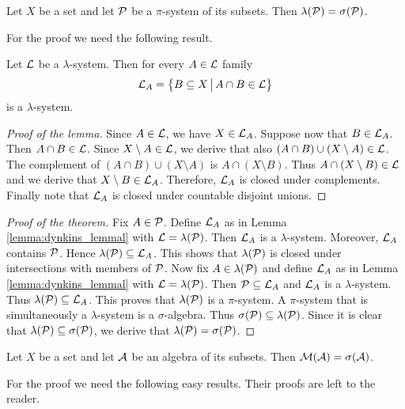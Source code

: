 \begin{theorem}\label{theorem:dynkins_lemma}
Let $X$ be a set and let ${\mathcal P}$ be a $\pi$-system of its subsets. Then $\lambda({\mathcal P})=\sigma({\mathcal P})$.
\end{theorem}
\noindent
For the proof we need the following result.

\begin{lemma}\label{lemma:dynkins_lemmal}
Let ${\mathcal L}$ be a $\lambda$-system. Then for every $A\in {\mathcal L}$ family
$${\mathcal L}_A=\big\{B\subseteq X\,\big|\,A\cap B\in {\mathcal L} \big\}$$
is a $\lambda$-system.
\end{lemma}
\begin{proof}[Proof of the lemma]
Since $A\in {\mathcal L}$, we have $X\in {\mathcal L}_A$. Suppose now that $B\in {\mathcal L}_A$. Then $A\cap B\in {\mathcal L}$. Since $X\setminus A\in {\mathcal L}$, we derive that also $(A\cap B) \cup (X\setminus A)\in {\mathcal L}$. The complement of $(A\cap B) \cup (X\setminus A)$ is $A\cap (X\setminus B)$. Thus $A\cap (X\setminus B) \in {\mathcal L}$ and we derive that $X\setminus B \in {\mathcal L}_A$. Therefore, ${\mathcal L}_A$ is closed under complements. Finally note that ${\mathcal L}_A$ is closed under countable disjoint unions. 
\end{proof}

\begin{proof}[Proof of the theorem]
Fix $A\in {\mathcal P}$. Define ${\mathcal L}_A$ as in Lemma \ref{lemma:dynkins_lemmal} with ${\mathcal L} = \lambda({\mathcal P})$. Then ${\mathcal L}_A$ is a $\lambda$-system. Moreover, ${\mathcal L}_A$ contains ${\mathcal P}$. Hence $\lambda({\mathcal P})\subseteq {\mathcal L}_A$. This shows that $\lambda({\mathcal P})$ is closed under intersections with members of ${\mathcal P}$. Now fix $A\in \lambda({\mathcal P})$ and define ${\mathcal L}_A$ as in Lemma \ref{lemma:dynkins_lemmal} with ${\mathcal L} = \lambda({\mathcal P})$. Then ${\mathcal P} \subseteq {\mathcal L}_A$ and ${\mathcal L}_A$ is a $\lambda$-system. Thus $\lambda({\mathcal P})\subseteq {\mathcal L}_A$. This proves that $\lambda({\mathcal P})$ is a $\pi$-system. A $\pi$-system that is simultaneously a $\lambda$-system is a $\sigma$-algebra. Thus $\sigma({\mathcal P})\subseteq \lambda({\mathcal P})$. Since it is clear that $\lambda({\mathcal P}) \subseteq \sigma({\mathcal P})$, we derive that $\lambda({\mathcal P})=\sigma({\mathcal P})$.
\end{proof}

\begin{theorem}\label{theorem:monotone_classes}
Let $X$ be a set and let ${\mathcal A}$ be an algebra of its subsets. Then ${\mathcal M}({\mathcal A})=\sigma({\mathcal A})$.
\end{theorem}
\noindent
For the proof we need the following easy results. Their proofs are left to the reader.

